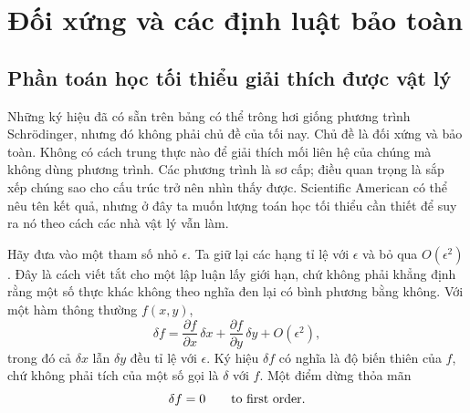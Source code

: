 \chapter{Đối xứng và các định luật bảo toàn}


\section{Phần toán học tối thiểu giải thích được vật lý}

Những ký hiệu đã có sẵn trên bảng có thể trông hơi giống phương trình Schrödinger, nhưng đó không phải chủ đề của tối nay. Chủ đề là đối xứng và bảo toàn. Không có cách trung thực nào để giải thích mối liên hệ của chúng mà không dùng phương trình. Các phương trình là sơ cấp; điều quan trọng là sắp xếp chúng sao cho cấu trúc trở nên nhìn thấy được. Scientific American có thể nêu tên kết quả, nhưng ở đây ta muốn lượng toán học tối thiểu cần thiết để suy ra nó theo cách các nhà vật lý vẫn làm.

Hãy đưa vào một tham số nhỏ \(\epsilon\). Ta giữ lại các hạng tỉ lệ với \(\epsilon\) và bỏ qua \(O(\epsilon^2)\). Đây là cách viết tắt cho một lập luận lấy giới hạn, chứ không phải khẳng định rằng một số thực khác không theo nghĩa đen lại có bình phương bằng không. Với một hàm thông thường \(f(x,y)\), \begin{equation}
  \delta f
  =\frac{\partial f}{\partial x}\,\delta x
   +\frac{\partial f}{\partial y}\,\delta y
   +O(\epsilon^2),
  \label{eq:first-variation-f}
\end{equation} trong đó cả \(\delta x\) lẫn \(\delta y\) đều tỉ lệ với \(\epsilon\). Ký hiệu \(\delta f\) có nghĩa là độ biến thiên của \(f\), chứ không phải tích của một số gọi là \(\delta\) với \(f\). Một điểm dừng thỏa mãn \begin{equation}
  \delta f=0
  \qquad\hbox{to first order.}
  \label{eq:stationary-f}
\end{equation}

